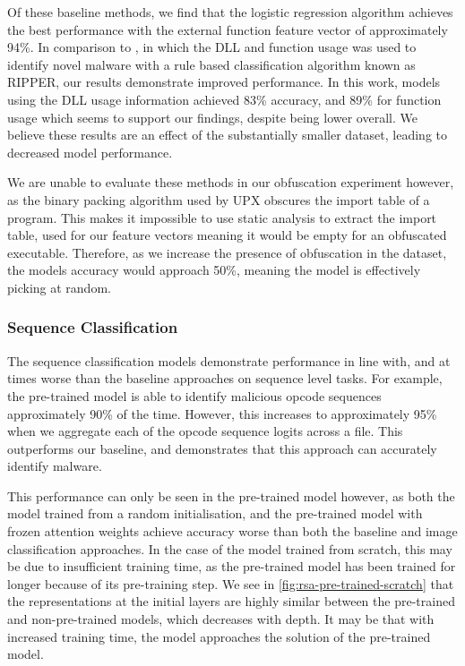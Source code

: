 \documentclass[conference,compsoc]{IEEEtran}
\begin{document}
Of these baseline methods, we find that the logistic regression algorithm achieves the best performance with the external function feature vector of approximately 94\%. In comparison to \cite{schultzDataMiningMethods2001a}, in which the DLL and function usage was used to identify novel malware with a rule based classification algorithm known as RIPPER, our results demonstrate improved performance. In this work, models using the DLL usage information achieved 83\% accuracy, and 89\% for function usage which seems to support our findings, despite being lower overall. We believe these results are an effect of the substantially smaller dataset, leading to decreased model performance. 

We are unable to evaluate these methods in our obfuscation experiment however, as the binary packing algorithm used by UPX obscures the import table of a program. This makes it impossible to use static analysis to extract the import table, used for our feature vectors meaning it would be empty for an obfuscated executable. Therefore, as we increase the presence of obfuscation in the dataset, the models accuracy would approach 50\%, meaning the model is effectively picking at random.

\subsubsection{Sequence Classification}

The sequence classification models demonstrate performance in line with, and at times worse than the baseline approaches on sequence level tasks. For example, the pre-trained model is able to identify malicious opcode sequences approximately 90\% of the time. However, this increases to approximately 95\% when we aggregate each of the opcode sequence logits across a file. This outperforms our baseline, and demonstrates that this approach can accurately identify malware. 

This performance can only be seen in the pre-trained model however, as both the model trained from a random initialisation, and the pre-trained model with frozen attention weights achieve accuracy worse than both the baseline and image classification approaches. In the case of the model trained from scratch, this may be due to insufficient training time, as the pre-trained model has been trained for longer because of its pre-training step. We see in \ref{fig:rsa-pre-trained-scratch} that the representations at the initial layers are highly similar between the pre-trained and non-pre-trained models, which decreases with depth. It may be that with increased training time, the model approaches the solution of the pre-trained model. 
\end{document}
